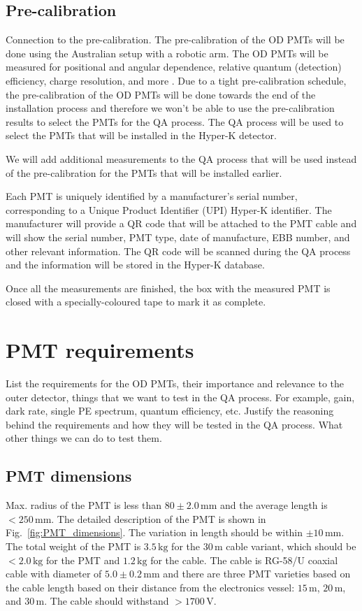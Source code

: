 \documentclass[12pt,a4paper]{article}
\begin{document}
\subsection{Pre-calibration}
Connection to the pre-calibration.
The pre-calibration of the OD PMTs will be done using the Australian setup with a robotic arm. The OD PMTs will be measured for positional and angular dependence, relative quantum (detection) efficiency, charge resolution, and more . Due to a tight pre-calibration schedule, the pre-calibration of the OD PMTs will be done towards the end of the installation process and therefore we won't be able to use the pre-calibration results to select the PMTs for the QA process. The QA process will be used to select the PMTs that will be installed in the Hyper-K detector.

We will add additional measurements to the QA process that will be used instead of the pre-calibration for the PMTs that will be installed earlier.

Each PMT is uniquely identified by a manufacturer's serial number, corresponding to a Unique Product Identifier (UPI) Hyper-K identifier. The manufacturer will provide a QR code that will be attached to the PMT cable and will show the serial number, PMT type, date of manufacture, EBB number, and other relevant information. The QR code will be scanned during the QA process and the information will be stored in the Hyper-K database.

Once all the measurements are finished, the box with the measured PMT is closed with a specially-coloured tape to mark it as complete.



\section{PMT requirements}
List the requirements for the OD PMTs, their importance and relevance to the outer detector, things that we want to test in the QA process. For example, gain, dark rate, single PE spectrum, quantum efficiency, etc. Justify the reasoning behind the requirements and how they will be tested in the QA process. What other things we can do to test them.


\subsection{PMT dimensions}

Max. radius of the PMT is less than $80\pm2.0\,\text{mm}$ and the average length is $< 250\,\text{mm}$. The detailed description of the PMT is shown in Fig.~\ref{fig:PMT_dimensions}. The variation in length should be within $\pm 10\,\text{mm}$. The total weight of the PMT is $3.5\,\text{kg}$ for the $30\,\text{m}$ cable variant, which should be $<2.0\,\text{kg}$ for the PMT and $1.2\,\text{kg}$ for the cable. The cable is RG-58/U coaxial cable with diameter of $5.0\pm0.2\,\text{mm}$ and there are three PMT varieties based on the cable length based on their distance from the electronics vessel: $15\,\text{m}$, $20\,\text{m}$, and $30\,\text{m}$. The cable should withstand $> 1700\,\text{V}$.
\end{document}
